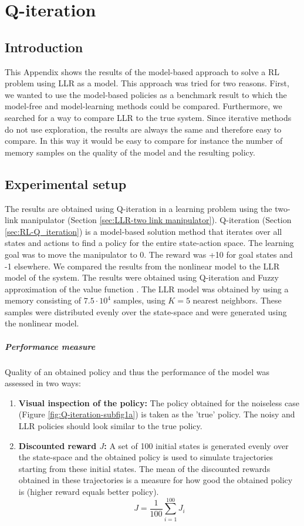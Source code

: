 \chapter{Q-iteration}\label{App:Q-iteration}


\section{Introduction}

This Appendix shows the results of the model-based approach to solve a \ac{RL} problem using \ac{LLR} as a model. This approach was tried for two reasons. First, we wanted to use the model-based policies as a benchmark result to which the model-free and model-learning methods could be compared. Furthermore, we searched for a way to compare \ac{LLR} to the true system. Since iterative methods do not use exploration, the results are always the same and therefore easy to compare. In this way it would be easy to compare for instance the number of memory samples on the quality of the model and the resulting policy.

\section{Experimental setup}
The results are obtained using Q-iteration in a learning problem using the two-link manipulator (Section \ref{sec:LLR-two link manipulator}). Q-iteration (Section \ref{sec:RL-Q_iteration}) is a model-based solution method that iterates over all states and actions to find a policy for the entire state-action space. The learning goal was to move the manipulator to 0. The reward was +10 for goal states and -1 elsewhere. We compared the results from the nonlinear model to the \ac{LLR} model of the system. The results were obtained using Q-iteration and Fuzzy approximation of the value function \cite{Busoniu:10}. The \ac{LLR} model was obtained by using a memory consisting of $7.5\cdot10^4$ samples, using $K=5$ nearest neighbors. These samples were distributed evenly over the state-space and were generated using the nonlinear model.


\paragraph{Performance measure}
Quality of an obtained policy and thus the performance of the model was assessed in two ways:
\begin{enumerate}
	\item \textbf{Visual inspection of the policy:} The policy obtained for the noiseless case (Figure \ref{fig:Q-iteration-subfig1a}) is taken as the 'true' policy. The noisy and \ac{LLR} policies should look similar to the true policy.
	\item \textbf{Discounted reward $J$:} A set of 100 initial states is generated evenly over the state-space and the obtained policy is used to simulate trajectories starting from these initial states. The mean of the discounted rewards obtained in these trajectories is a measure for how good the obtained policy is (higher reward equals better policy).
	$$
		J = \frac{1}{100}\sum_{i=1}^{100}{J_i}
	$$
\end{enumerate}


